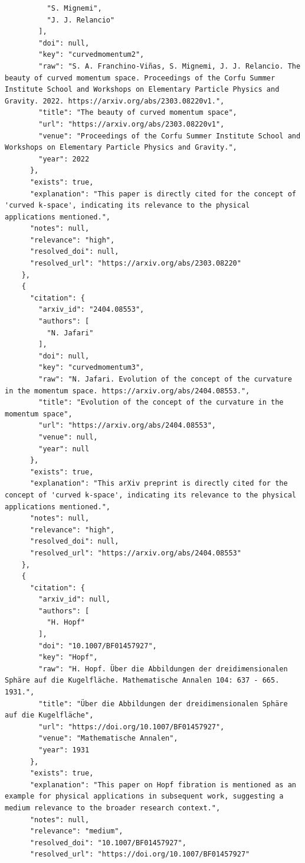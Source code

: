 \documentclass[11pt]{article}
\begin{document}
\begin{verbatim}
          "S. Mignemi",
          "J. J. Relancio"
        ],
        "doi": null,
        "key": "curvedmomentum2",
        "raw": "S. A. Franchino-Viñas, S. Mignemi, J. J. Relancio. The beauty of curved momentum space. Proceedings of the Corfu Summer Institute School and Workshops on Elementary Particle Physics and Gravity. 2022. https://arxiv.org/abs/2303.08220v1.",
        "title": "The beauty of curved momentum space",
        "url": "https://arxiv.org/abs/2303.08220v1",
        "venue": "Proceedings of the Corfu Summer Institute School and Workshops on Elementary Particle Physics and Gravity.",
        "year": 2022
      },
      "exists": true,
      "explanation": "This paper is directly cited for the concept of 'curved k-space', indicating its relevance to the physical applications mentioned.",
      "notes": null,
      "relevance": "high",
      "resolved_doi": null,
      "resolved_url": "https://arxiv.org/abs/2303.08220"
    },
    {
      "citation": {
        "arxiv_id": "2404.08553",
        "authors": [
          "N. Jafari"
        ],
        "doi": null,
        "key": "curvedmomentum3",
        "raw": "N. Jafari. Evolution of the concept of the curvature in the momentum space. https://arxiv.org/abs/2404.08553.",
        "title": "Evolution of the concept of the curvature in the momentum space",
        "url": "https://arxiv.org/abs/2404.08553",
        "venue": null,
        "year": null
      },
      "exists": true,
      "explanation": "This arXiv preprint is directly cited for the concept of 'curved k-space', indicating its relevance to the physical applications mentioned.",
      "notes": null,
      "relevance": "high",
      "resolved_doi": null,
      "resolved_url": "https://arxiv.org/abs/2404.08553"
    },
    {
      "citation": {
        "arxiv_id": null,
        "authors": [
          "H. Hopf"
        ],
        "doi": "10.1007/BF01457927",
        "key": "Hopf",
        "raw": "H. Hopf. Über die Abbildungen der dreidimensionalen Sphäre auf die Kugelfläche. Mathematische Annalen 104: 637 - 665. 1931.",
        "title": "Über die Abbildungen der dreidimensionalen Sphäre auf die Kugelfläche",
        "url": "https://doi.org/10.1007/BF01457927",
        "venue": "Mathematische Annalen",
        "year": 1931
      },
      "exists": true,
      "explanation": "This paper on Hopf fibration is mentioned as an example for physical applications in subsequent work, suggesting a medium relevance to the broader research context.",
      "notes": null,
      "relevance": "medium",
      "resolved_doi": "10.1007/BF01457927",
      "resolved_url": "https://doi.org/10.1007/BF01457927"

\end{verbatim}
\end{document}
